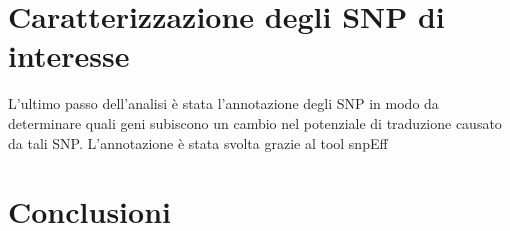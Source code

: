 \section{Caratterizzazione degli SNP di interesse}
L'ultimo passo dell'analisi \`e stata l'annotazione degli SNP in modo da determinare quali geni subiscono un cambio nel potenziale di traduzione causato da tali SNP.
L'annotazione \`e stata svolta grazie al tool snpEff \cite{snpeff}



\section{Conclusioni}
\label{sec:ending}
